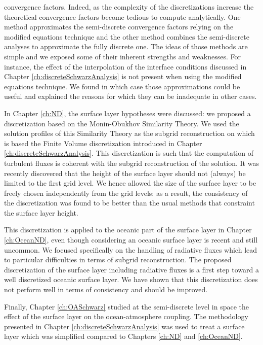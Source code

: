 convergence factors.
Indeed, as the complexity of the discretizations increase the
theoretical convergence factors become tedious to
compute analytically.
One method approximates the semi-discrete convergence factors
relying on the modified equations technique and
the other method combines the semi-discrete analyses
to approximate the fully discrete one.
The ideas of those methods are simple and we exposed some
of their inherent strengths and weaknesses.
For instance, the effect of the interpolation of the interface
conditions discussed in Chapter \ref{ch:discreteSchwarzAnalysis}
is not present when using the modified equations technique.
We found in which case those approximations could be useful and
explained the reasons for which they can be inadequate in other
cases.
\par
In Chapter \ref{ch:ND}, the surface layer hypotheses were discussed:
we proposed a discretization based on the Monin-Obukhov Similarity
Theory.
We used the solution profiles of this Similarity Theory
as the subgrid reconstruction on which is based
the Finite Volume discretization introduced in Chapter
\ref{ch:discreteSchwarzAnalysis}.
This discretization
is such that the computation of turbulent fluxes is coherent
with the subgrid reconstruction of the solution.
It was recently discovered that the height of the
surface layer should not (always) be limited to the first grid level.
We hence allowed the size of the surface layer to be freely chosen 
independently from the grid levels: as a result, the
consistency of the discretization was found to be better than
the usual methods that constraint the surface layer height.
\par
This discretization is applied to the oceanic part of the surface
layer in Chapter \ref{ch:OceanND}, even though considering an oceanic
surface layer is recent and still uncommon. We focused specifically
on the handling of radiative fluxes which lead to particular
difficulties in terms of subgrid reconstruction. The proposed
discretization of the surface layer including radiative fluxes
is a first step toward a well discretized oceanic surface layer.
We have shown that this discretization does not perform well in
terms of consistency and should be improved.
\par
Finally, Chapter \ref{ch:OASchwarz} studied at the semi-discrete
level in space the effect of the surface layer on the
ocean-atmosphere coupling.
The methodology presented in Chapter \ref{ch:discreteSchwarzAnalysis}
was used to treat a surface layer which was simplified compared to
Chapters \ref{ch:ND} and \ref{ch:OceanND}.

